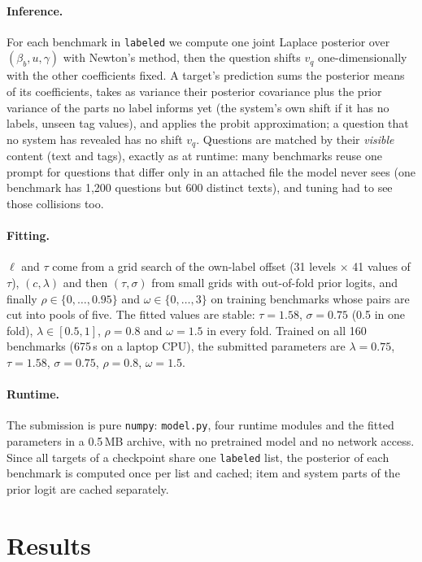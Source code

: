 \documentclass{article}
\newcommand{\code}[1]{\texttt{#1}}
\newcommand{\labeled}{\code{labeled}}
\begin{document}
\paragraph{Inference.} For each benchmark in \labeled{} we compute one joint Laplace posterior over $(\beta_b, u, \gamma)$ with Newton's method, then the question shifts $v_q$ one-dimensionally with the other coefficients fixed. A target's prediction sums the posterior means of its coefficients, takes as variance their posterior covariance plus the prior variance of the parts no label informs yet (the system's own shift if it has no labels, unseen tag values), and applies the probit approximation; a question that no system has revealed has no shift $v_q$. Questions are matched by their \emph{visible} content (text and tags), exactly as at runtime: many benchmarks reuse one prompt for questions that differ only in an attached file the model never sees (one benchmark has 1{,}200 questions but 600 distinct texts), and tuning had to see those collisions too.

\paragraph{Fitting.} $\ell$ and $\tau$ come from a grid search of the own-label offset (31 levels $\times$ 41 values of $\tau$), $(c,\lambda)$ and then $(\tau,\sigma)$ from small grids with out-of-fold prior logits, and finally $\rho \in \{0,\dots,0.95\}$ and $\omega \in \{0,\dots,3\}$ on training benchmarks whose pairs are cut into pools of five. The fitted values are stable: $\tau=1.58$, $\sigma=0.75$ (0.5 in one fold), $\lambda \in [0.5, 1]$, $\rho = 0.8$ and $\omega = 1.5$ in every fold. Trained on all 160 benchmarks (675\,s on a laptop CPU), the submitted parameters are $\lambda = 0.75$, $\tau=1.58$, $\sigma=0.75$, $\rho=0.8$, $\omega=1.5$.

\paragraph{Runtime.} The submission is pure \code{numpy}: \code{model.py}, four runtime modules and the fitted parameters in a 0.5\,MB archive, with no pretrained model and no network access. Since all targets of a checkpoint share one \labeled{} list, the posterior of each benchmark is computed once per list and cached; item and system parts of the prior logit are cached separately.

\section{Results}
\label{sec:results}
\end{document}
